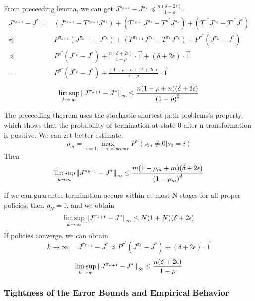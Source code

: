\begin{theorem}
    From preceeding lemma, we can get $ J^{\pi_{k+1}} - J^{\pi_{k}} \preceq \frac{n(\delta + 2\epsilon)}{1 - \rho}  $.
    \begin{align*}
        J^{\pi_{k+1}} - J^{*} =& (J^{\pi_{k+1}} - T^{\pi_{k+1}} J^{\pi_k}) + (T^{\pi_{k+1}}J^{\pi_k} - T^{\pi^*} J^{\pi_k}) + (T^{\pi^*}J^{\pi_k} - T^{\pi^*}J^{*})\\
        \preceq& P^{\pi_{k+1}} (J^{\pi_{k+1}} - J^{\pi_k}) + \left( T^{\pi_{k+1}} J^{\pi_k} - T^{\pi_k} J^{\pi_k} \right) + P^{\pi^*}\left( J^{\pi_k} - J^* \right)\\
        \preceq& P^{\pi^*}\left( J^{\pi_k} - J^* \right) + \frac{n(\delta+2\epsilon)}{1 - \rho} \cdot \vec{1} + (\delta + 2\epsilon)\cdot \vec{1} \\
        =& P^{\pi^*}\left( J^{\pi_k} - J^* \right) + \frac{(1 - \rho + n)(\delta + 2\epsilon)}{1 - \rho} \cdot \vec{1}
    \end{align*}
    \[
        \limsup_{k \rightarrow \infty} {\Arrowvert J^{\pi_{k+1}} - J^{*}\Arrowvert}_\infty \le \frac{n(1 - \rho + n)(\delta + 2\epsilon)}{{(1 - \rho)}^2} 
    \]
\end{theorem}

The preceeding theorem uses the stochastic shortest path problems's property, which shows that the probability of termination at state 0 after n transformation is positive. We can get better estimate.
\[
    \rho_m = \max_{i = 1, \ldots, n; \pi:proper} P^{\pi}\left( s_m \ne 0 | s_0 = i \right)
\]
Then
\[
        \limsup_{k \rightarrow \infty} {\Arrowvert J^{\pi_{k+1}} - J^{*}\Arrowvert}_\infty \le \frac{m(1 - \rho_{m} + m)(\delta + 2\epsilon)}{{(1 - \rho_{m})}^2} 
\]

If we can guarantee termination occurs within at most N stages for all proper policies, then $ \rho_N = 0 $, and we obtain
\[
    \limsup_{k \rightarrow \infty} {\Arrowvert J^{\pi_{k+1}} - J^{*}\Arrowvert}_\infty \le N(1 + N) (\delta + 2\epsilon)
\]
If policies converge, we can obtain
\[
    k \rightarrow \infty, \quad J^{\pi_{k+1}} - J^{*} \preceq P^{\pi^*} (J^{\pi_k} - J^*) + (\delta + 2\epsilon) \cdot \vec{1}
\]
\[
    \limsup_{k \rightarrow \infty} {\Arrowvert J^{\pi_{k+1}} - J^{*}\Arrowvert}_\infty \le \frac{n(\delta + 2\epsilon)}{1 - \rho} 
\]

\subsubsection{Tightness of the Error Bounds and Empirical Behavior}%

